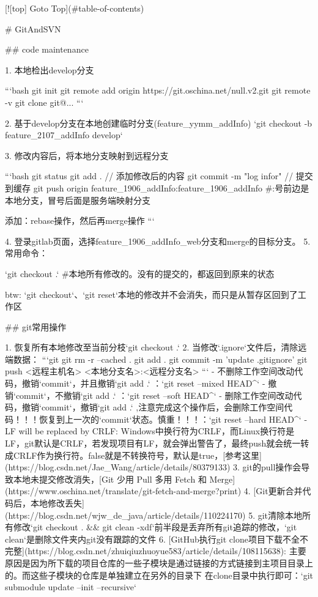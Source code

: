 [![top] Goto Top](#table-of-contents)

# GitAndSVN

## code maintenance

1. 本地检出develop分支

```bash
git init
git remote add origin https://git.oschina.net/null.v2.git
git remote -v
git clone git@...
```

2. 基于develop分支在本地创建临时分支(feature_yymm_addInfo)
   `git checkout -b feature_2107_addInfo develop`


3. 修改内容后，将本地分支映射到远程分支

```bash
git status
git add .                           // 添加修改后的内容
git commit -m "log infor"           // 提交到缓存
git push origin feature_1906_addInfo:feature_1906_addInfo    #:号前边是本地分支，冒号后面是服务端映射分支

添加：rebase操作，然后再merge操作
```


4. 登录gitlab页面，选择feature_1906_addInfo_web分支和merge的目标分支。
5. 常用命令：

`git checkout .` #本地所有修改的。没有的提交的，都返回到原来的状态

btw: `git checkout`、`git reset`本地的修改并不会消失，而只是从暂存区回到了工作区

## git常用操作

1. 恢复所有本地修改至当前分枝`git checkout .`
2. 当修改`.ignore`文件后，清除远端数据：
```git
git rm -r --cached . 
git add . 
git commit -m 'update .gitignore'
git push <远程主机名> <本地分支名>:<远程分支名>
```
- 不删除工作空间改动代码，撤销`commit`，并且撤销`git add .` ：`git reset --mixed HEAD^`
- 撤销`commit`，不撤销`git add .` ：`git reset --soft HEAD^`
- 删除工作空间改动代码，撤销`commit`，撤销`git add .` ,注意完成这个操作后，会删除工作空间代码！！！恢复到上一次的`commit`状态。慎重！！！：`git reset --hard HEAD^`
- LF will be replaced by CRLF: Windows中换行符为CRLF，而Linux换行符是LF，git默认是CRLF，若发现项目有LF，就会弹出警告了，最终push就会统一转成CRLF作为换行符。false就是不转换符号，默认是true，[参考这里](https://blog.csdn.net/Jae_Wang/article/details/80379133)
3. git的pull操作会导致本地未提交修改消失，[Git 少用 Pull 多用 Fetch 和 Merge](https://www.oschina.net/translate/git-fetch-and-merge?print)
4. [Git更新合并代码后，本地修改丢失](https://blog.csdn.net/wjw_de_java/article/details/110224170)
5. git清除本地所有修改`git checkout . && git clean -xdf`前半段是丢弃所有git追踪的修改，`git clean`是删除文件夹内git没有跟踪的文件
6. [GitHub执行git clone项目下载不全不完整](https://blog.csdn.net/zhuiqiuzhuoyue583/article/details/108115638):
  主要原因是因为所下载的项目仓库的一些子模块是通过链接的方式链接到主项目目录上的。而这些子模块的仓库是单独建立在另外的目录下
  在clone目录中执行即可：`git submodule update --init --recursive`

